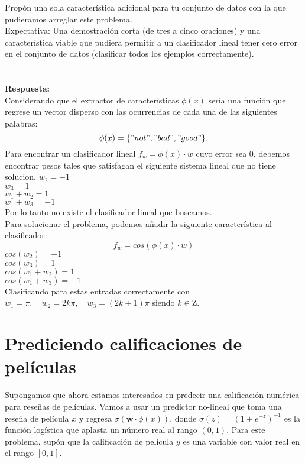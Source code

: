 \documentclass{article}
\begin{document}
Propón una sola característica adicional para tu conjunto de datos con la que pudieramos arreglar este problema.\\

Expectativa: Una demostración corta (de tres a cinco oraciones) y una característica viable que pudiera permitir a un clasificador lineal tener cero error en el conjunto de datos (clasificar todos los ejemplos correctamente).\\
\\

\\\textbf{Respuesta:}\\
Considerando que el extractor de características $\phi(x)$ sería una función que regrese un vector disperso con las ocurrencias de cada una de las siguientes palabras:
$$
\phi(x)=\{"not", "bad", "good"\} .
$$
Para encontrar un clasificador lineal $ f_w=\phi(x)\cdot w $ cuyo error sea 0, debemos encontrar pesos tales que satisfagan el siguiente sistema lineal que no tiene solucion.
$w_2 = -1$\\
$w_3 = 1$\\
$w_1+w_2 = 1$\\
$w_1+w_3 = -1$\\
Por lo tanto no existe el clasificador lineal que buscamos.\\

Para solucionar el problema, podemos añadir la siguiente característica al clasificador:\\
$$ f_w=cos(\phi(x)\cdot w) $$
$cos(w_2) = -1  $\\
$cos(w_3) = 1 $\\
$cos(w_1+w_2) = 1 $\\
$cos(w_1+w_3) = -1 $\\
Clasificando para estas entradas correctamente con $w_1=\pi,\quad w_2 = 2k\pi,\quad w_3 = (2k+1)\pi$ siendo $k\in \mathrm{Z}$.\\



\section{Prediciendo calificaciones de películas}
 Supongamos que ahora estamos interesados en predecir una calificación numérica para reseñas de películas. Vamos a usar un predictor no-lineal que toma una reseña de película $x$ y regresa $\sigma(\boldsymbol{w} \cdot \phi(x))$, donde $\sigma(z)=\left(1+e^{-z}\right)^{-1}$ es la función logística que aplasta un número real al rango $(0,1)$. Para este problema, supón que la calificación de película $y$ es una variable con valor real en el rango $[0,1]$.\\
 
\end{document}
